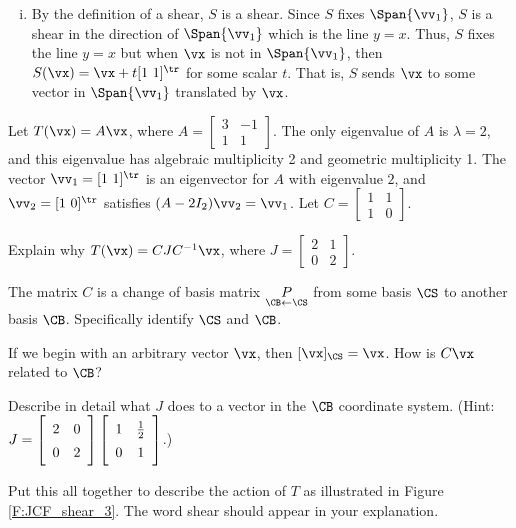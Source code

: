 \begin{enumerate}[i.]
\item  By the definition of a shear, $S$ is a shear. Since $S$ fixes $\Span\{ \vv_1\}$, $S$ is a shear in the direction of $\Span\{\vv_1\}$ which is the line $y=x$. Thus, $S$ fixes the line $y=x$ but when $\vx$ is not in $\Span\{\vv_1\}$, then $S(\vx) = \vx + t[1 \ 1]^{\tr}$ for some scalar $t$. That is, $S$ sends $\vx$ to some vector in $\Span\{\vv_1\}$ translated by $\vx$. 

	\end{enumerate}

\ea

\begin{activity} \label{act:JCF_geometry} Let $T(\vx) = A\vx$, where $A = \left[ \begin{array}{cr} 3&-1\\1&1 \end{array} \right]$. The only eigenvalue of $A$ is $\lambda = 2$, and this eigenvalue has algebraic multiplicity 2 and geometric multiplicity 1. The vector $\vv_1 = [1 \ 1]^{\tr}$ is an eigenvector for $A$ with eigenvalue $2$, and $\vv_2 = [1 \ 0]^{\tr}$ satisfies $(A - 2I_2)\vv_2 = \vv_1$. Let $C = \left[ \begin{array}{cc} 1&1\\1&0 \end{array} \right]$.
\ba
\item Explain why $T(\vx) = CJC^{-1}\vx$, where $J = \left[ \begin{array}{cc} 2&1\\0&2 \end{array} \right]$.  

\item The matrix $C$ is a change of basis matrix $\underset{\CB \leftarrow \CS}{P}$ from some basis $\CS$ to another basis $\CB$. Specifically identify $\CS$ and $\CB$. 

\item If we begin with an arbitrary vector $\vx$, then $[\vx]_{\CS} = \vx$. How is $C \vx$ related to $\CB$? 

\item Describe in detail what $J$ does to a vector in the $\CB$ coordinate system. (Hint: $J =  \left[ \begin{array}{cc} 2&0\\0&2 \end{array} \right]  \left[ \renewcommand{\arraystretch}{1.4}\begin{array}{cc} 1&\frac{1}{2}\\0&1 \end{array} \right]$.)

\item Put this all together to describe the action of $T$ as illustrated in Figure \ref{F:JCF_shear_3}. The word shear should appear in your explanation. 

\ea

\end{activity}


